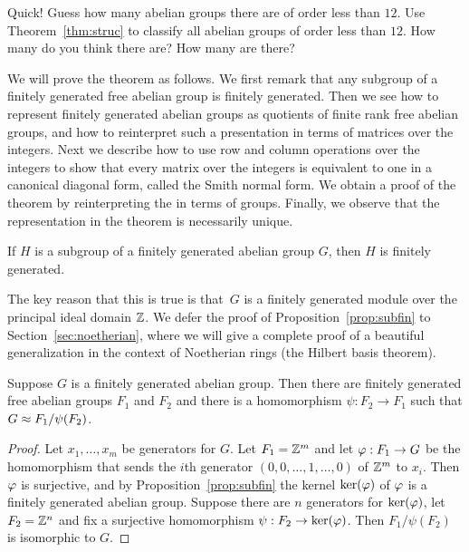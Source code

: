\begin{exercise}
	Quick! Guess how many abelian groups there are of order less than $12$.
	Use Theorem~\ref{thm:struc} to classify all abelian groups of order
	less than $12$. How many do you think there are? How many are there?
\end{exercise}

We will prove the theorem as follows.  We first remark that any
subgroup of a finitely generated free abelian group is finitely
generated.  Then we see how to represent finitely generated abelian groups
as quotients of finite rank free abelian groups, and how to
reinterpret such a presentation in terms of matrices over the
integers.  Next we describe how to use row and column operations over
the integers to show that every matrix over the integers is equivalent
to one in a canonical diagonal form, called the Smith normal form.  We
obtain a proof of the theorem by reinterpreting the  in
terms of groups.  Finally, we observe that
the representation in the theorem is necessarily unique.

\begin{proposition}\label{prop:subfin}
	If $H$ is a subgroup of a finitely generated abelian group $G$,
	then $H$ is finitely generated.
\end{proposition}
The key reason that this is true is that~$G$ is a finitely generated
module over the principal ideal domain $\mathbb{Z}$.  We defer the
proof of Proposition~\ref{prop:subfin} to Section~\ref{sec:noetherian},
where we will give a complete proof of a beautiful generalization
in the context of Noetherian rings (the Hilbert basis theorem).

\begin{corollary}
	\label{cor:presentation}
	Suppose $G$ is a finitely generated abelian group. Then there are
	finitely generated free abelian groups $F_1$ and $F_2$ and there is
	a homomorphism $\psi:F_2 \to F_1$ such that $G \approx F_1/\psi(F_2)$.
\end{corollary}
\begin{proof}
	Let $x_1,\ldots, x_m$ be generators for $G$. Let $F_1=\mathbb{Z}^m$ and let
	$\varphi:F_1\to G$ be the homomorphism that sends the $i$th generator
	$(0,0,\ldots,1,\ldots,0)$ of $\mathbb{Z}^m$ to $x_i$. Then $\varphi$ is
	surjective, and by Proposition~\ref{prop:subfin} the
	kernel $\ker(\varphi)$ of $\varphi$ is a finitely generated abelian
	group. Suppose there are $n$ generators for $\ker(\varphi)$, let
	$F_2 = \mathbb{Z}^n$ and fix a surjective homomorphism $\psi:F_2
	\to \ker(\varphi)$. Then $F_1 / \psi(F_2)$ is isomorphic to $G$.
\end{proof}

